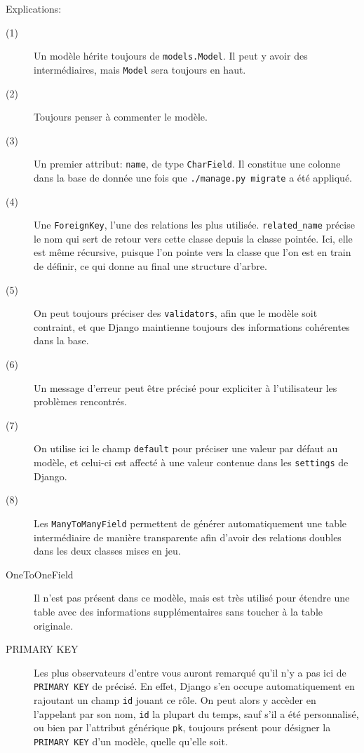 \documentclass[a4paper]{report}
\begin{document}
\par Explications:
\begin{description}
    \item[(1)] Un modèle hérite toujours de \verb#models.Model#. Il peut y avoir des intermédiaires, mais \verb#Model#
        sera toujours en haut.
    \item[(2)] Toujours penser à commenter le modèle.
    \item[(3)] Un premier attribut: \verb#name#, de type \verb#CharField#. Il constitue une colonne dans la base de
        donnée une fois que \verb#./manage.py migrate# a été appliqué.
    \item[(4)] Une \verb#ForeignKey#, l'une des relations les plus utilisée. \verb#related_name# précise le nom qui sert
        de retour vers cette classe depuis la classe pointée. Ici, elle est même récursive, puisque l'on pointe vers la
        classe que l'on est en train de définir, ce qui donne au final une structure d'arbre.
    \item[(5)] On peut toujours préciser des \verb#validators#, afin que le modèle soit contraint, et que Django
        maintienne toujours des informations cohérentes dans la base.
    \item[(6)] Un message d'erreur peut être précisé pour expliciter à l'utilisateur les problèmes rencontrés.
    \item[(7)] On utilise ici le champ \verb#default# pour préciser une valeur par défaut au modèle, et celui-ci est
        affecté à une valeur contenue dans les \verb#settings# de Django.
    \item[(8)] Les \verb#ManyToManyField# permettent de générer automatiquement une table intermédiaire de manière
        transparente afin d'avoir des relations doubles dans les deux classes mises en jeu.
    \item[OneToOneField] Il n'est pas présent dans ce modèle, mais est très utilisé pour étendre une table avec des
        informations supplémentaires sans toucher à la table originale.
    \item[PRIMARY KEY] Les plus observateurs d'entre vous auront remarqué qu'il n'y a pas ici de \verb#PRIMARY KEY# de précisé. En
        effet, Django s'en occupe automatiquement en rajoutant un champ \verb#id# jouant ce rôle. On peut alors y
        accèder en l'appelant par son nom, \verb#id# la plupart du temps, sauf s'il a été personnalisé, ou bien par
        l'attribut générique \verb#pk#, toujours présent pour désigner la \verb#PRIMARY KEY# d'un modèle, quelle qu'elle
        soit.
\end{description}
\end{document}
